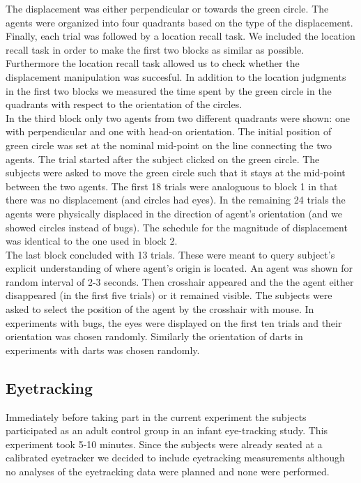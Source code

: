 \documentclass[10pt]{article}
\begin{document}
The displacement was either perpendicular or towards the green circle. 
The agents were organized into four quadrants based on the type of the displacement. 
Finally, each trial was followed by a location recall task. 
We included the location recall task in order to make the first two blocks as similar as possible. 
Furthermore the location recall task allowed us to check whether the displacement manipulation was succesful.
In addition to the location judgments in the first two blocks we measured the time spent by the green circle in the quadrants with respect to the orientation of the circles.\\
In the third block only two agents from two different quadrants were shown: one with perpendicular and one with head-on orientation. 
The initial position of green circle was set at the nominal mid-point on the line connecting the two agents. 
The trial started after the subject clicked on the green circle. 
The subjects were asked to move the green circle such that it stays at the mid-point between the two agents. 
The first 18 trials were analoguous to block 1 in that there was no displacement (and circles had eyes). 
In the remaining 24 trials the agents were physically displaced in the direction of agent's orientation (and we showed circles instead of bugs). 
The schedule for the magnitude of displacement was identical to the one used in block 2.\\
The last block concluded with 13 trials. 
These were meant to query subject's explicit understanding of where agent's origin is located. 
An agent was shown for random interval of 2-3 seconds. 
Then crosshair appeared and the the agent either disappeared (in the first five trials) or it remained visible. 
The subjects were asked to select the position of the agent by the crosshair with mouse. 
In experiments with bugs, the eyes were displayed on the first ten trials and their orientation was chosen randomly. 
Similarly the orientation of darts in experiments with darts was chosen randomly.\\
 
\subsection*{Eyetracking}
Immediately before taking part in the current experiment the subjects participated as an adult control group in an infant eye-tracking study. 
This experiment took 5-10 minutes. 
Since the subjects were already seated at a calibrated eyetracker we decided to include eyetracking measurements although no analyses of the eyetracking data were planned and none were performed.
\end{document}
